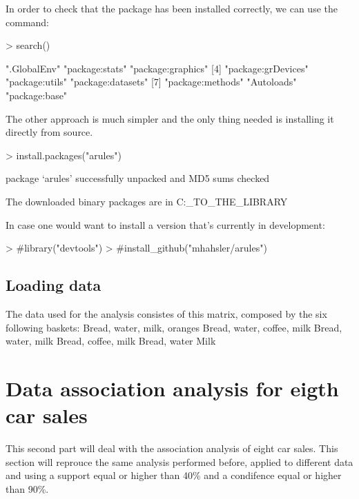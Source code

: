 \documentclass[a4paper]{article}
\begin{document}
\begin{Schunk}
In order to check that the package has been installed correctly, we can use the command:
\begin{Schunk}
\begin{Sinput}
> search()
\end{Sinput}
\begin{Soutput}
[1] ".GlobalEnv"        "package:stats"     "package:graphics" 
[4] "package:grDevices" "package:utils"     "package:datasets" 
[7] "package:methods"   "Autoloads"         "package:base"     
\end{Soutput}
\end{Schunk}


The other approach is much simpler and the only thing needed is installing it
directly from source.

\begin{Schunk}
\begin{Sinput}
> install.packages("arules")
\end{Sinput}
\begin{Soutput}
package ‘arules’ successfully unpacked and MD5 sums checked

The downloaded binary packages are in
	C:\Users\PATH_TO_THE_LIBRARY
\end{Soutput}
\end{Schunk}

In case one would want to install a version that's currently in development:
\begin{Schunk}
\begin{Sinput}
> #library("devtools")
> #install_github("mhahsler/arules")
\end{Sinput}
\end{Schunk}


\subsection*{Loading data}

The data used for the analysis consistes of this matrix, composed by the six
following baskets:
{Bread, water,  milk,   oranges}
{Bread, water,  coffee, milk}
{Bread, water,  milk}
{Bread, coffee, milk}
{Bread, water}
{Milk}



\section*{Data association analysis for eigth car sales}
This second part will deal with the association analysis of eight car sales.
This section will reprouce the same analysis performed before, applied to
different data and using a support equal or higher than 40\% and a condifence
equal or higher than 90\%.


\end{Schunk}
\end{document}
